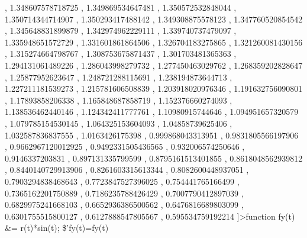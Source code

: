 \documentclass[
]{book}
\begin{document}
, 1.348607578718725 ,   1.349869534647481 , 1.350572532848044 , 1.350714344714907 ,   1.350293417488142 , 1.349308875578123 , 1.347760520854542 ,   1.345648831899879 , 1.342974962229111 , 1.339740737479097 ,   1.335948651572729 , 1.331601861864506 , 1.326704183275865 ,   1.321260081430156 , 1.315274664798767 , 1.308753675871437 ,   1.301703481365363 , 1.294131061489226 , 1.286043998279732 ,   1.277450463029762 , 1.268359202828647 , 1.25877952623647 ,   1.248721288115691 , 1.238194873644713 , 1.227211181539273 ,   1.215781606508839 , 1.203918020976346 , 1.191632756090801 ,   1.17893858206338 , 1.165848687858719 , 1.152376660274093 ,   1.138536462440146 , 1.124342411777761 , 1.10980915744646 ,   1.094951657320579 , 1.079785154530145 , 1.064325153604093 ,   1.04858739625406 , 1.032587836837555 , 1.0163426175398 ,   0.999868043313951 , 0.9831805566197906 , 0.9662967120012925 ,   0.9492331505436565 , 0.932006574250646 , 0.9146337203831 ,   0.897131335799599 , 0.8795161513401855 , 0.8618048562939812 ,   0.8440140729913906 , 0.8261603315613344 , 0.8082600448937051 ,   0.7903294838468643 , 0.7723847527396025 , 0.754441765166499 ,   0.7365162201750889 , 0.7186235788426429 , 0.7007790412897039 ,   0.6829975241668103 , 0.6652936386500562 , 0.6476816689803099 ,   0.6301755515800127 , 0.6127888547805567 , 0.595534759192214 \right]\]\textgreater function fy(t) \&= r(t)*sin(t); \$'fy(t)=fy(t)
\end{document}
